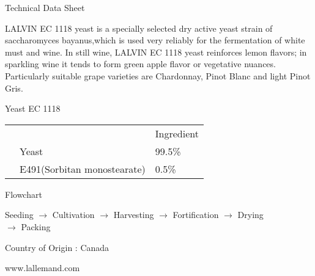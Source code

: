 \documentclass[a4paper,12pt]{oblivoir}
\begin{document}
\thispagestyle{empty}
\begin{flushright}
Technical Data Sheet
\end{flushright}

LALVIN EC 1118 yeast is a specially selected dry active yeast strain of saccharomyces bayanus,which is used very reliably for the fermentation of white must and wine. In still wine, LALVIN EC 1118 yeast reinforces lemon flavors; in sparkling wine it tends to form green apple flavor or vegetative nuances. Particularly suitable grape varieties are Chardonnay, Pinot Blanc and light Pinot Gris.

\rule{0cm}{1cm}

Yeast EC 1118
\begin{center}
\begin{tabu}{X[-1]X[-1]X[r]}
&&Ingredient\\
&Yeast&99.5\%\\
&E491(Sorbitan monostearate)&0.5\%\\
\end{tabu}
\end{center}

\rule{0cm}{1cm}

Flowchart 

\begin{center}
Seeding $\to$ Cultivation  $\to$ Harvesting $\to$ Fortification $\to$ Drying\\ $\to$ Packing
\end{center}




\rule{0cm}{3cm}

\begin{footnotesize}Country of Origin : Canada\end{footnotesize}

\rule{0cm}{.5cm}

\centering
www.lallemand.com
\end{document}
